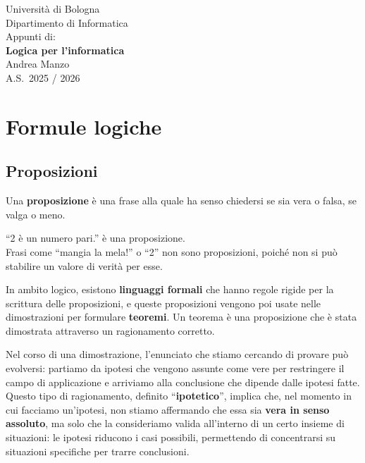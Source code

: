 \documentclass[
  a4paper,
]{article}
\author{}
\date{}
\begin{document}
\begin{titlepage}
\thispagestyle{empty}
\begin{center}
{\large\textcolor[HTML]{555555}{Università di Bologna}}\\[0.5em]
{\normalsize\textcolor[HTML]{777777}{Dipartimento di Informatica}}\\[6em]

{\normalsize\textcolor[HTML]{555555}{Appunti di:}}\\[0.8em]
{\huge\bfseries Logica per l’informatica}\\[6em]

{\Large Andrea Manzo}\\[1.2em]
{\large A.S.\ 2025 / 2026}\\[6em]
\end{center}
\end{titlepage}


{
\setcounter{tocdepth}{3}
\tableofcontents
}
\newpage

\hypertarget{formule-logiche}{%
\section{Formule logiche}\label{formule-logiche}}

\hypertarget{proposizioni}{%
\subsection{Proposizioni}\label{proposizioni}}

Una \textbf{proposizione} è una frase alla quale ha senso chiedersi se
sia vera o falsa, se valga o meno.

\begin{examplebox}[Esempio]

``2 è un numero pari.'' è una proposizione.\\
Frasi come ``mangia la mela!'' o ``2'' non sono proposizioni, poiché non
si può stabilire un valore di verità per esse.

\end{examplebox}

In ambito logico, esistono \textbf{linguaggi formali} che hanno regole
rigide per la scrittura delle proposizioni, e queste proposizioni
vengono poi usate nelle dimostrazioni per formulare \textbf{teoremi}. Un
teorema è una proposizione che è stata dimostrata attraverso un
ragionamento corretto.

Nel corso di una dimostrazione, l'enunciato che stiamo cercando di
provare può evolversi: partiamo da ipotesi che vengono assunte come vere
per restringere il campo di applicazione e arriviamo alla conclusione
che dipende dalle ipotesi fatte. Questo tipo di ragionamento, definito
``\textbf{ipotetico}'', implica che, nel momento in cui facciamo
un'ipotesi, non stiamo affermando che essa sia \textbf{vera in senso
assoluto}, ma solo che la consideriamo valida all'interno di un certo
insieme di situazioni: le ipotesi riducono i casi possibili, permettendo
di concentrarsi su situazioni specifiche per trarre conclusioni.
\end{document}

